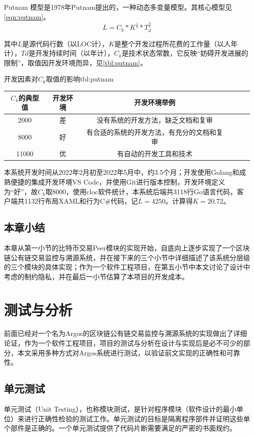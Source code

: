 \documentclass[supercite]{HustGraduPaper}
\newcommand{\reqn}[1]{\autoref{eqn:#1}}
\newcommand{\rtbl}[1]{\autoref{tbl:#1}}
\theoremstyle{definition}
\begin{document}
Putnam 模型是1978年Putnam提出的，一种动态多变量模型。其核心模型见\reqn{putnam}。
\begin{equation}
  L = C_k * K^{\frac{1}{3}} * T_d^{\frac{4}{3}}\label{eqn:putnam}
\end{equation}

其中$L$是源代码行数（以LOC计），$K$是整个开发过程所花费的工作量（以人年计），$Td$是开发持续时间（以年计），$C_k$是技术状态常数，它反映“妨碍开发进展的限制”，取值因开发环境而异，见\rtbl{putnam}。

\begin{generaltab}{开发因素对$C_k$取值的影响}{tbl:putnam}
  \begin{tabular}{c|ccccc}
    \toprule
    $C_k$的典型值          & 开发环境 & 开发环境举例      \\
    \midrule
    2000&差&没有系统的开发方法，缺乏文档和复审\\
    8000&好&有合适的系统的开发方法，有充分的文档和复审\\
    11000&优&有自动的开发工具和技术\\
    \bottomrule
  \end{tabular}
\end{generaltab}

本系统开发时间从2022年2月初至2022年5月中，约3.5个月；开发使用Golang和成熟便捷的集成开发环境VS Code，并使用Git进行版本控制，开发环境定义为“好”，故$C_k$取8000，使用cloc软件统计，本系统后端共3118行Go语言代码，客户端共1132行布局XAML和行为C\#代码，记$L=4250$。计算得$K=20.72$。
\subsection{本章小结}

本章从第一小节的比特币交易Peer模块的实现开始，自底向上逐步实现了一个区块链公有链交易监控与溯源系统，并在接下来的三个小节中详细描述了该系统分层级的三个模块的具体实现；作为一个软件工程项目，在第五小节中本文讨论了设计中考虑的制约隐私，并在最后一小节估算了本项目的开发成本。

\newpage
\section{测试与分析}
前面已经对一个名为Argos的区块链公有链交易监控与溯源系统的实现做出了详细论证，作为一个软件工程项目，项目的测试与分析在设计与实现后是必不可少的部分，本文采用多种方式对Argos系统进行测试，以验证前文实现的正确性和可靠性。

\subsection{单元测试}
单元测试（Unit Testing），也称模块测试，是针对程序模块（软件设计的最小单位）来进行正确性检验的测试工作。单元测试的目标是隔离程序部件并证明这些单个部件是正确的。一个单元测试提供了代码片断需要满足的严密的书面规约。
\end{document}
